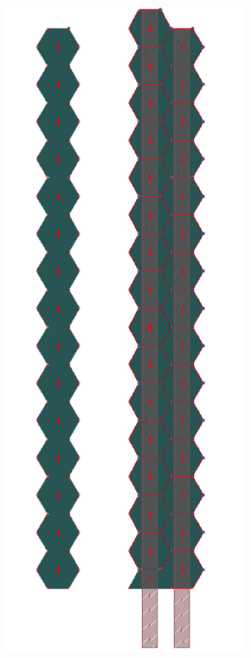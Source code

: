 \begin{figure}
	\begin{subfigure}[b]{.49\textwidth}
		\includegraphics[width=\linewidth]{Calorimeter/SiliconTungstenSiD/hexagon}

\end{subfigure}
\end{figure}
